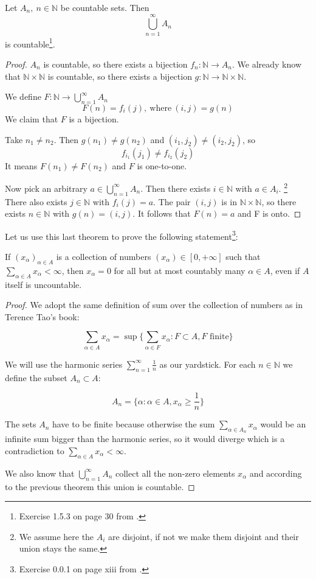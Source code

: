 \begin{thm}
Let $A_n, ~n \in \mathbb{N}$ be countable sets. Then 
$$
\bigcup_{n=1}^\infty A_n
$$ 
is countable\footnote{Exercise 1.5.3 on page 30 from .}.
\end{thm}

\begin{proof}
$A_n$ is countable, so there exists a bijection $f_n:\mathbb{N} \rightarrow A_n$. We already know that $\mathbb{N} \times \mathbb{N}$ is countable, so there exists a bijection $g:\mathbb{N} \rightarrow \mathbb{N} \times \mathbb{N}$.

We define $F:\mathbb{N} \rightarrow \bigcup_{n=1}^\infty A_n$
$$
F(n) = f_i(j), ~\text{where}~ (i, j) = g(n)
$$
We claim that $F$ is a bijection.

Take $n_1 \ne n_2$. Then $g(n_1) \ne g(n_2)$ and $(i_1, j_2) \ne (i_2, j_2)$, so 
$$
f_{i_1}(j_1) \ne f_{i_2}(j_2)
$$
It means $F(n_1) \ne F(n_2)$ and $F$ is one-to-one.

Now pick an arbitrary $a \in \bigcup_{n=1}^\infty A_n$. Then there exists $i \in \mathbb{N}$ with $a \in A_i$. \footnote{We assume here the $A_i$ are disjoint, if not we make them disjoint and their union stays the same.} There also exists $j \in \mathbb{N}$ with $f_i(j) = a$. The pair $(i, j)$ is in
$\mathbb{N} \times \mathbb{N}$, so there exists $n \in \mathbb{N}$ with $g(n)=(i, j)$. It follows that $F(n)=a$ and F is onto. 
\end{proof}

Let us use this last theorem to prove the following statement\footnote{Exercise 0.0.1 on page xiii from .}:

\begin{thm}
If $(x_\alpha)_{\alpha \in A}$ is a collection of numbers $(x_\alpha) \in [0, +\infty]$ such that $\sum_{\alpha \in A} x_\alpha < \infty$, then $x_\alpha = 0$ for all but at most countably many $\alpha \in A$, even if $A$ itself is uncountable.
\end{thm}

\begin{proof}

We adopt the same definition of sum over the collection of numbers as in Terence Tao's book:

$$
\sum_{\alpha \in A} x_\alpha = \sup\{\sum_{\alpha \in F} x_\alpha: F \subset A, F \text{ finite}\}
$$

We will use the harmonic series $\sum_{n=1}^\infty \frac{1}{n}$ as our yardstick. For each $n \in \mathbb{N}$ we define the subset $A_n \subset A$:

$$
A_n = \{\alpha: \alpha \in A, x_\alpha \geq \frac{1}{n}\}
$$

The sets $A_n$ have to be finite because otherwise the sum $\sum_{\alpha \in A_n} x_\alpha$ would be an infinite sum bigger than the harmonic series, so it would diverge which is a contradiction to $\sum_{\alpha \in A} x_\alpha < \infty$.

We also know that $\bigcup_{n=1}^\infty A_n$ collect all the non-zero elements $x_\alpha$ and according to the previous theorem this union is countable. 
\end{proof}